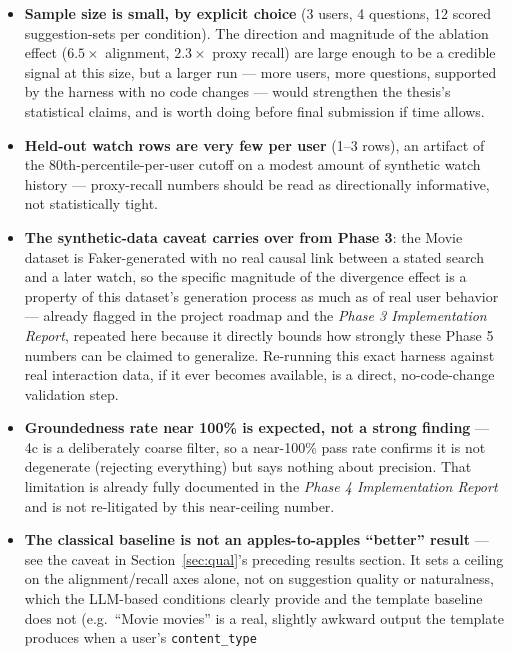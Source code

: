 \documentclass[11pt,a4paper]{article}
\newcommand{\code}[1]{\texttt{#1}}
\begin{document}
\begin{itemize}
    \item \textbf{Sample size is small, by explicit choice} (3 users, 4 questions, 12 scored
        suggestion-sets per condition). The direction and magnitude of the ablation effect
        ($6.5\times$ alignment, $2.3\times$ proxy recall) are large enough to be a credible signal
        at this size, but a larger run --- more users, more questions, supported by the harness
        with no code changes --- would strengthen the thesis's statistical claims, and is worth
        doing before final submission if time allows.
    \item \textbf{Held-out watch rows are very few per user} (1--3 rows), an artifact of the
        80th-percentile-per-user cutoff on a modest amount of synthetic watch history ---
        proxy-recall numbers should be read as directionally informative, not statistically tight.
    \item \textbf{The synthetic-data caveat carries over from Phase 3}: the Movie dataset is
        Faker-generated with no real causal link between a stated search and a later watch, so the
        specific magnitude of the divergence effect is a property of this dataset's generation
        process as much as of real user behavior --- already flagged in the project roadmap and the
        \emph{Phase 3 Implementation Report}, repeated here because it directly bounds how strongly
        these Phase 5 numbers can be claimed to generalize. Re-running this exact harness against
        real interaction data, if it ever becomes available, is a direct, no-code-change validation
        step.
    \item \textbf{Groundedness rate near 100\% is expected, not a strong finding} --- 4c is a
        deliberately coarse filter, so a near-100\% pass rate confirms it is not degenerate
        (rejecting everything) but says nothing about precision. That limitation is already fully
        documented in the \emph{Phase 4 Implementation Report} and is not re-litigated by this
        near-ceiling number.
    \item \textbf{The classical baseline is not an apples-to-apples ``better'' result} --- see the
        caveat in Section~\ref{sec:qual}'s preceding results section. It sets a ceiling on the
        alignment/recall axes alone, not on suggestion quality or naturalness, which the LLM-based
        conditions clearly provide and the template baseline does not (e.g.\ ``Movie movies'' is a
        real, slightly awkward output the template produces when a user's \code{content\_type}

\end{itemize}
\end{document}
